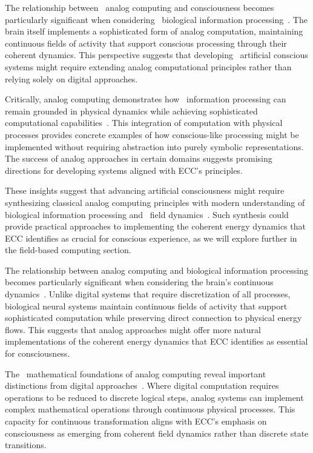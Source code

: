 The relationship between~ analog computing and consciousness becomes particularly significant when considering~ biological information processing~\cite{vonNeumann1963, Nikolic2019}. The brain itself implements a sophisticated form of analog computation, maintaining continuous fields of activity that support conscious processing through their coherent dynamics. This perspective suggests that developing~ artificial conscious systems might require extending analog computational principles rather than relying solely on digital approaches.

Critically, analog computing demonstrates how~ information processing can remain grounded in physical dynamics while achieving sophisticated computational capabilities~\cite{PourEl2017, Pribram2017}. This integration of computation with physical processes provides concrete examples of how conscious-like processing might be implemented without requiring abstraction into purely symbolic representations. The success of analog approaches in certain domains suggests promising directions for developing systems aligned with ECC's principles.

These insights suggest that advancing artificial consciousness might require synthesizing classical analog computing principles with modern understanding of biological information processing and~ field dynamics~\cite{Chua2017, Fromherz2019}. Such synthesis could provide practical approaches to implementing the coherent energy dynamics that ECC identifies as crucial for conscious experience, as we will explore further in the field-based computing section.

The relationship between analog computing and biological information processing becomes particularly significant when considering the brain's continuous dynamics~\cite{Ashby1960, Haken2020}. Unlike digital systems that require discretization of all processes, biological neural systems maintain continuous fields of activity that support sophisticated computation while preserving direct connection to physical energy flows. This suggests that analog approaches might offer more natural implementations of the coherent energy dynamics that ECC identifies as essential for consciousness.

The~ mathematical foundations of analog computing reveal important distinctions from digital approaches~\cite{BialynickiBirula1976, Calude2018a}. Where digital computation requires operations to be reduced to discrete logical steps, analog systems can implement complex mathematical operations through continuous physical processes. This capacity for continuous transformation aligns with ECC's emphasis on consciousness as emerging from coherent field dynamics rather than discrete state transitions.


